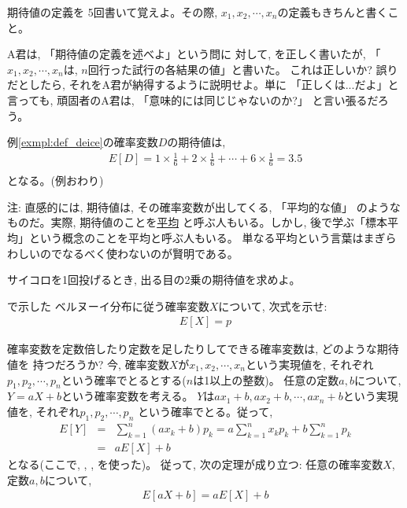 \begin{q}\label{q:stat_defexp1} 期待値の定義を
5回書いて覚えよ。その際, $x_1, x_2, \cdots, x_n$の定義もきちんと書くこと。
\end{q}

\begin{q}\label{q:stat_defexp2} A君は, 「期待値の定義を述べよ」という問に
対して, を正しく書いたが, 
「$x_1, x_2, \cdots, x_n$は, $n$回行った試行の各結果の値」と書いた。
これは正しいか? 誤りだとしたら, それをA君が納得するように説明せよ。単に
「正しくは...だよ」と言っても, 頑固者のA君は, 「意味的には同じじゃないのか?」
と言い張るだろう。
\end{q}

\begin{exmpl} 例\ref{exmpl:def_deice}の確率変数$D$の期待値は, 
\begin{eqnarray}
E[D]=1\times\frac{1}{6}+2\times\frac{1}{6}+\cdots+6\times\frac{1}{6}=3.5\nonumber\\\label{eq:diceexpect}
\end{eqnarray}
となる。(例おわり)\end{exmpl}
\mv

{\small 注: 直感的には, 期待値は, その確率変数が出してくる, 「平均的な値」
のようなものだ。実際, 期待値のことを\underline{平均}
と呼ぶ人もいる。しかし, 後で学ぶ「標本平均」という概念のことを平均と呼ぶ人もいる。
単なる平均という言葉はまぎらわしいのでなるべく使わないのが賢明である。}\\

\begin{q}\label{q:stat_coin_sq} サイコロを1回投げるとき, 出る目の2乗の期待値を求めよ。
\end{q}\mv

\begin{q}\label{q:stat_Bernoulli} で示した
ベルヌーイ分布に従う確率変数$X$について, 次式を示せ:
\begin{eqnarray}
E[X]=p\label{q:stat_Bernoulli_E}
\end{eqnarray}
\end{q}\mv

確率変数を定数倍したり定数を足したりしてできる確率変数は, どのような期待値を
持つだろうか? 今, 確率変数$X$が$x_1, x_2, \cdots, x_n$という実現値を, 
それぞれ$p_1, p_2, \cdots, p_n$という確率でとるとする($n$は1以上の整数)。
任意の定数$a, b$について, $Y=aX+b$という確率変数を考える。
$Y$は$ax_1+b, ax_2+b, \cdots, ax_n+b$という実現値を, それぞれ$p_1, p_2, \cdots, p_n$
という確率でとる。従って, 
\begin{eqnarray}E[Y]&=&\sum_{k=1}^{n}(ax_k+b)p_k=a\sum_{k=1}^{n}x_kp_k+b\sum_{k=1}^{n}p_k\nonumber\\
                    &=&aE[X]+b\end{eqnarray}
となる(ここで, , , を使った)。
従って, 次の定理が成り立つ: 任意の確率変数$X$, 定数$a, b$について, 
\begin{eqnarray}E[aX+b]=aE[X]+b\label{eq:stochX_aX_B}\end{eqnarray}

